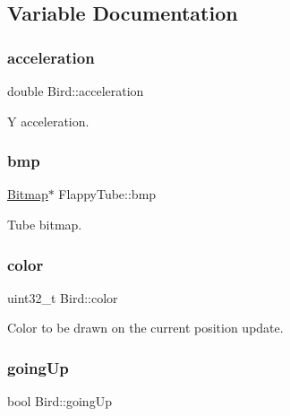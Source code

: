\subsection{Variable Documentation}
\mbox{\label{group__flappy_gaacd6cd48cfa7bd2824488c23fa64396c}} 
\subsubsection{\texorpdfstring{acceleration}{acceleration}}
{\footnotesize\ttfamily double Bird\+::acceleration}



Y acceleration. 

\mbox{\label{group__flappy_ga7baae1562a0fdd78f0fdf9bc095d11b7}} 
\subsubsection{\texorpdfstring{bmp}{bmp}}
{\footnotesize\ttfamily \mbox{\hyperlink{struct_bitmap}{Bitmap}}$\ast$ Flappy\+Tube\+::bmp}



Tube bitmap. 

\mbox{\label{group__flappy_ga99a3ab5ac95874c8563f8c24aa79ae54}} 
\subsubsection{\texorpdfstring{color}{color}}
{\footnotesize\ttfamily uint32\+\_\+t Bird\+::color}



Color to be drawn on the current position update. 

\mbox{\label{group__flappy_ga4bdcadd04d95df1a76b650b03e103522}} 
\subsubsection{\texorpdfstring{going\+Up}{goingUp}}
{\footnotesize\ttfamily bool Bird\+::going\+Up}



